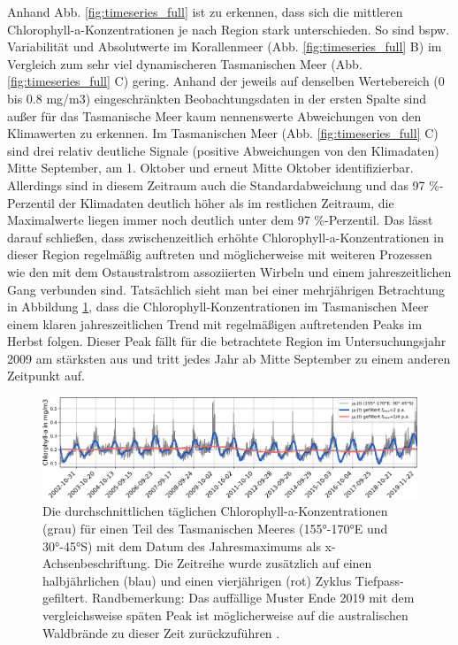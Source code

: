 \documentclass[12pt,a4paper,onecolumn]{scrartcl}
\begin{document}
Anhand Abb. \ref{fig:timeseries_full} ist zu erkennen, dass sich die mittleren Chlorophyll-a-Konzentrationen je nach Region stark unterschieden. So sind bspw. Variabilität und Absolutwerte im Korallenmeer (Abb. \ref{fig:timeseries_full} B) im Vergleich zum sehr viel dynamischeren Tasmanischen Meer (Abb. \ref{fig:timeseries_full} C) gering. Anhand der jeweils auf denselben Wertebereich (0 bis 0.8 mg/m3) eingeschränkten Beobachtungsdaten in der ersten Spalte sind außer für das Tasmanische Meer kaum nennenswerte Abweichungen von den Klimawerten zu erkennen. Im Tasmanischen Meer (Abb. \ref{fig:timeseries_full} C) sind drei relativ deutliche Signale (positive Abweichungen von den Klimadaten) Mitte September, am 1. Oktober und erneut Mitte Oktober identifizierbar. Allerdings sind in diesem Zeitraum auch die Standardabweichung und das 97 \%-Perzentil der Klimadaten deutlich höher als im restlichen Zeitraum, die Maximalwerte liegen immer noch deutlich unter dem 97 \%-Perzentil. Das lässt darauf schließen, dass zwischenzeitlich erhöhte Chlorophyll-a-Konzentrationen in dieser Region regelmäßig auftreten und möglicherweise mit weiteren Prozessen wie den mit dem Ostaustralstrom assoziierten Wirbeln und einem jahreszeitlichen Gang \citep{Tilburg.2002} verbunden sind. Tatsächlich sieht man bei einer mehrjährigen Betrachtung in Abbildung \ref{fig:long_timeseries_tasman}, dass die Chlorophyll-Konzentrationen im Tasmanischen Meer einem klaren jahreszeitlichen Trend mit regelmäßigen auftretenden Peaks im Herbst folgen. Dieser Peak fällt für die betrachtete Region im Untersuchungsjahr 2009 am stärksten aus und tritt jedes Jahr ab Mitte September zu einem anderen Zeitpunkt auf.
\begin{figure}[!htb]
\includegraphics[width=\textwidth]{bilder/long_timeseries_tasman.png}
\caption{Die durchschnittlichen täglichen Chlorophyll-a-Konzentrationen (grau) für einen Teil des Tasmanischen Meeres (155°-170°E und 30°-45°S) mit dem Datum des Jahresmaximums als x-Achsenbeschriftung. Die Zeitreihe wurde zusätzlich auf einen halbjährlichen (blau) und einen vierjährigen (rot) Zyklus Tiefpass-gefiltert. Randbemerkung: Das auffällige Muster Ende 2019 mit dem vergleichsweise späten Peak ist möglicherweise auf die australischen Waldbrände zu dieser Zeit zurückzuführen \citep{Li.2021}.} \label{fig:long_timeseries_tasman}
\end{figure}
\end{document}
